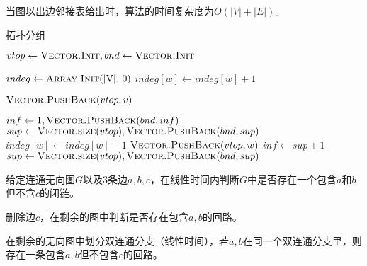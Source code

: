 \begin{questions}
\begin{solution}
        当图以出边邻接表给出时，算法的时间复杂度为$O(|V| + |E|)$。

        \begin{algorithm}[H]
            \caption{拓扑分组} \label{alg:0413:02}
            \begin{algorithmic}[1]

                \State $vtop \gets \Call{Vector.Init}{}, bnd \gets \Call{Vector.Init}{}$

                \State $indeg \gets \Call{Array.Init}{$|V|, 0$}$  
                \State $indeg[w] \gets indeg[w] + 1$
                \EndFor

                 
                \State $\Call{Vector.PushBack}{vtop, v}$
                \EndFor

                \Statex {}
                \State $inf \gets 1, \Call{Vector.PushBack}{bnd, inf}$
                \State $sup \gets \Call{Vector.size}{vtop}, \Call{Vector.PushBack}{bnd, sup}$
                 
                 
                \State $indeg[w] \gets indeg[w] - 1$ 
                 
                \State $\Call{Vector.PushBack}{vtop, w}$
                \EndIf
                \EndFor
                \EndFor
                \State $inf \gets sup + 1$
                \State $sup \gets \Call{Vector.size}{vtop}, \Call{Vector.PushBack}{bnd, sup}$
                \EndWhile
            \end{algorithmic}
        \end{algorithm}

    \end{solution}

    \question 给定连通无向图$G$以及3条边$a,b,c$，在线性时间内判断$G$中是否存在一个包含$a$和$b$但不含$c$的闭链。

    \begin{solution}
        删除边$c$，在剩余的图中判断是否存在包含$a,b$的回路。

        在剩余的无向图中划分双连通分支（线性时间），若$a,b$在同一个双连通分支里，则存在一条包含$a,b$但不包含$c$的回路。
    \end{solution}

\end{questions}


